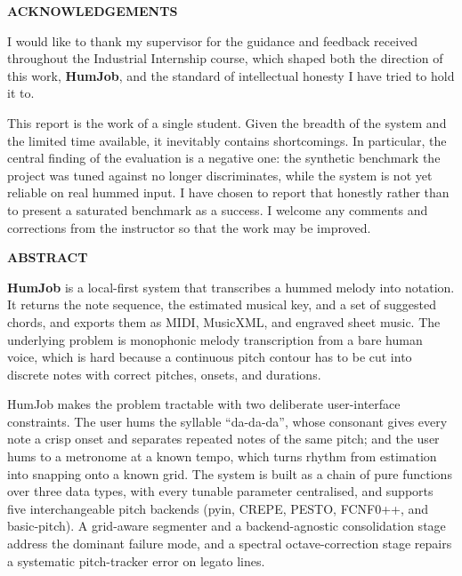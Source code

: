 \documentclass[12pt,a4paper]{article}
\begin{document}
\newpage
\begin{center}
    \textbf{\large ACKNOWLEDGEMENTS}
\end{center}

I would like to thank my supervisor for the guidance and feedback received
throughout the Industrial Internship course, which shaped both the direction of this work,
\textbf{HumJob}, and the standard of intellectual honesty I have tried to hold
it to.

This report is the work of a single student. Given the breadth of the system
and the limited time available, it inevitably contains shortcomings. In
particular, the central finding of the evaluation is a negative one: the
synthetic benchmark the project was tuned against no longer discriminates,
while the system is not yet reliable on real hummed input. I have chosen to
report that honestly rather than to present a saturated benchmark as a
success. I welcome any comments and corrections from the instructor so that
the work may be improved.

\newpage
\begin{center}
    \textbf{\large ABSTRACT}
\end{center}

\textbf{HumJob} is a local-first system that transcribes a hummed melody into
notation. It returns the note sequence, the estimated musical key, and a set
of suggested chords, and exports them as MIDI, MusicXML, and engraved sheet
music. The underlying problem is monophonic melody transcription from a bare
human voice, which is hard because a continuous pitch contour has to be cut
into discrete notes with correct pitches, onsets, and durations.

HumJob makes the problem tractable with two deliberate user-interface
constraints. The user hums the syllable ``da-da-da'', whose consonant gives
every note a crisp onset and separates repeated notes of the same pitch; and
the user hums to a metronome at a known tempo, which turns rhythm from
estimation into snapping onto a known grid. The system is built as a chain of
pure functions over three data types, with every tunable parameter
centralised, and supports five interchangeable pitch backends (pyin, CREPE,
PESTO, FCNF0++, and basic-pitch). A grid-aware segmenter and a
backend-agnostic consolidation stage address the dominant failure mode, and a
spectral octave-correction stage repairs a systematic pitch-tracker error on
legato lines.
\end{document}
